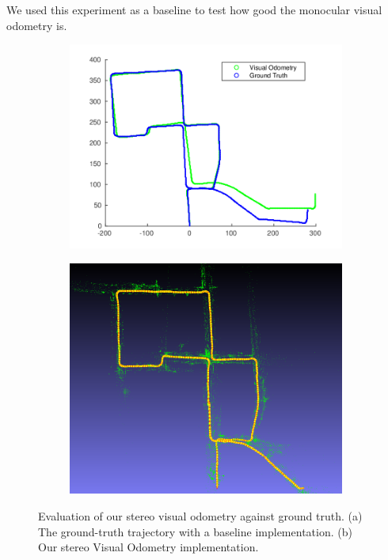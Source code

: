 \documentclass{article}
\begin{document}
We used this experiment as a baseline to test how good the monocular visual odometry is.

\begin{figure}[h]
    \centering
    \begin{subfigure}[b]{.45\textwidth}
    \centering
        \includegraphics[width=\linewidth]{./avisingh}
        \caption{}
    \end{subfigure}
    \begin{subfigure}[b]{.45\textwidth}
    \centering
        \includegraphics[width=\linewidth]{./vo_stereo_5}
        \caption{}
    \end{subfigure}
    \caption{Evaluation of our stereo visual odometry against ground truth. (a) The ground-truth trajectory with a baseline implementation. (b) Our stereo Visual Odometry implementation.}
    \label{fig:groundtruth}
\end{figure} 
\end{document}
